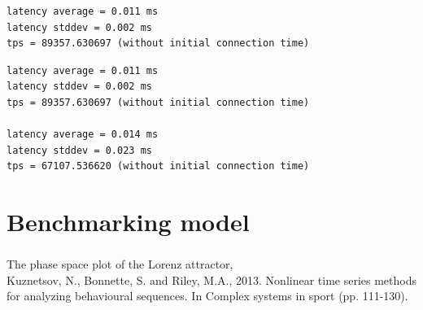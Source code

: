 \documentclass[usenames,dvipsnames, 18pt, compress, aspectratio=169]{beamer}
\begin{document}
\begin{frame}[fragile]{}
    \frametitle{}
    \begin{center}

		\begin{overprint}[12.5cm]
        \begin{verbatim}
latency average = 0.011 ms
latency stddev = 0.002 ms
tps = 89357.630697 (without initial connection time)
        \end{verbatim}

        \begin{verbatim}
latency average = 0.011 ms
latency stddev = 0.002 ms
tps = 89357.630697 (without initial connection time)

latency average = 0.014 ms
latency stddev = 0.023 ms
tps = 67107.536620 (without initial connection time)
        \end{verbatim}
		\end{overprint}

    \end{center}
\end{frame}

\section{Benchmarking model}

\begin{frame}
    \frametitle{}
    \begin{center}
        {
            The phase space plot of the Lorenz attractor, \\
            {\scriptsize
             \color{gray!60}
                 Kuznetsov, N., Bonnette, S. and Riley, M.A., 2013. Nonlinear time series methods\\
                 for analyzing behavioural sequences. In Complex systems in sport (pp. 111-130).}}

    \end{center}
\end{frame}
\end{document}
